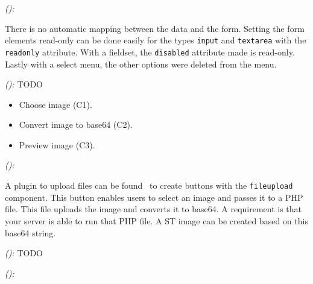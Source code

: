 \documentclass[a4paper]{artikel3}
\newcommand{\code}[1]{\texttt{#1}}
\newcommand{\framework}[2]{ \emph{#1 (\textbf{#2}): }} %
\begin{document}
\framework{\jqma{}}{}

There is no automatic mapping between the data and the form.
Setting the form elements read-only can be done easily for the types \code{input} and \code{textarea} with the \code{readonly} attribute.
With a fieldset, the \code{disabled} attribute made is read-only.
Lastly with a select menu, the other options were deleted from the menu.

\framework{\lungoa{}}{}
TODO

% 
% 
% 

\begin{itemize}
  \item Choose image (C1).
  \item Convert image to base64 (C2).
  \item Preview image (C3).
\end{itemize}

\framework{\sta{}}{}

A plugin to upload files can be found~\cite{Smirnov2012} to create buttons with the \code{fileupload} component.  
This button enables users to select an image and passes it to a PHP file.  
This file uploads the image and converts it to base64.
A requirement is that your server is able to run that PHP file.    
A ST image can be created based on this base64 string.

\framework{\kendoa{}}{}
TODO

\framework{\jqma{}}{}
\end{document}

